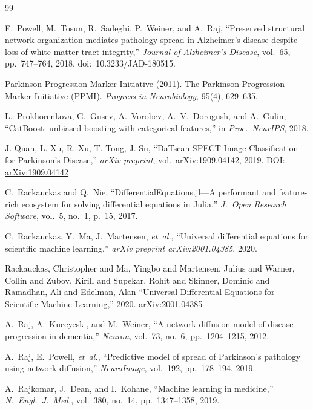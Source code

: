 \begin{thebibliography}{99}

F.~Powell, M.~Tosun, R.~Sadeghi, P.~Weiner, and A.~Raj, ``Preserved structural network organization mediates pathology spread in Alzheimer's disease despite loss of white matter tract integrity,'' \textit{Journal of Alzheimer's Disease}, vol.~65, pp.~747--764, 2018. doi:~10.3233/JAD-180515.


Parkinson Progression Marker Initiative (2011).
\newblock The Parkinson Progression Marker Initiative (PPMI).
\newblock \emph{Progress in Neurobiology}, 95(4), 629--635.

L.~Prokhorenkova, G.~Gusev, A.~Vorobev, A.~V.~Dorogush, and A.~Gulin, ``CatBoost: unbiased boosting with categorical features,'' in \textit{Proc.\ NeurIPS}, 2018.

J. Quan, L. Xu, R. Xu, T. Tong, J. Su,
``DaTscan SPECT Image Classification for Parkinson's Disease,''
\textit{arXiv preprint}, vol.~arXiv:1909.04142, 2019. DOI: \href{https://arxiv.org/abs/1909.04142}{arXiv:1909.04142}

C.~Rackauckas and Q.~Nie, ``DifferentialEquations.jl---A performant and feature-rich ecosystem for solving differential equations in Julia,'' \textit{J.\ Open Research Software}, vol.~5, no.~1, p.~15, 2017.

C.~Rackauckas, Y.~Ma, J.~Martensen, \textit{et~al.}, ``Universal differential equations for scientific machine learning,'' \textit{arXiv preprint arXiv:2001.04385}, 2020.

 Rackauckas, Christopher and Ma, Yingbo and Martensen, Julius and Warner, Collin and Zubov, Kirill and Supekar, Rohit and Skinner, Dominic and Ramadhan, Ali and Edelman, Alan ``Universal Differential Equations for Scientific Machine Learning,'' 2020. arXiv:2001.04385

A.~Raj, A.~Kuceyeski, and M.~Weiner, ``A network diffusion model of disease progression in dementia,'' \textit{Neuron}, vol.~73, no.~6, pp.~1204--1215, 2012.

A.~Raj, E.~Powell, \textit{et~al.}, ``Predictive model of spread of Parkinson's pathology using network diffusion,'' \textit{NeuroImage}, vol.~192, pp.~178--194, 2019.

A.~Rajkomar, J.~Dean, and I.~Kohane, ``Machine learning in medicine,'' \textit{N.\ Engl.\ J.\ Med.}, vol.~380, no.~14, pp.~1347--1358, 2019.


\end{thebibliography}
